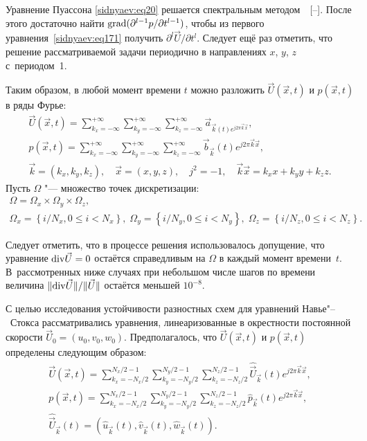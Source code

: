 Уравнение Пуассона \eqref{sidnyaev:eq20} решается спектральным методом~~[--]. 
После этого достаточно найти $\mathop{\rm grad}({\partial^{l-1}p}/{\partial t^{l-1}})$, чтобы
из первого уравнения~\eqref{sidnyaev:eq171} получить ${\partial ^l\vec {U}}/
{\partial t^l}$. 
Следует ещё раз отметить, что решение рассматриваемой задачи периодично в направлениях $x$, $y$, $z$ с~периодом~1.

Таким образом, в любой момент времени $t$ можно разложить $\vec {U}(\vec {x},t )$ и $p (\vec {x},t)$ в ряды Фурье:
\begin{gather*}
\vec {U}(\vec {x},t)=\sum\limits_{k_x =-\infty}^{+\infty}
\sum\limits_{k_y =-\infty }^{+\infty} \sum\limits_{k_z =-\infty
}^{+\infty } \vec {a}_{\vec {k} ( t )e^{j 2 \pi \vec {k} \vec {x}}},\\
p(\vec {x},t)=\sum\limits_{k_x =-\infty }^{+\infty }
\sum\limits_{k_y =-\infty }^{+\infty} \sum\limits_{k_z =-\infty
}^{+\infty } \vec {b}_{\vec {k}} ( t )e^{j2\pi \vec{k}\vec {x}}, \\
\vec {k}= ( k_x,k_y,k_z ), \quad \vec {x}=(x,y,z), \quad j^2=-1, \quad 
\vec {k}\vec {x}=k_x x+k_y y+k_z z.
\end{gather*}
Пусть $\Omega $ "--- множество точек дискретизации: 
\begin{gather*}
\Omega =\Omega_x \times
\Omega _y \times \Omega _z, \\
\Omega _x =\left\{ {i}/{N_x}, 0\le i<N_x \right\},
\;
\Omega _y =\left\{ {i}/{N_y}, 0\le i<N_y \right\},\;
\Omega _z =\left\{ {i}/{N_z}, 0\le i<N_z \right\}.
\end{gather*}

Следует отметить, что в процессе решения использовалось допущение, что
уравнение ${\rm div}\vec {U}=0$ остаётся справедливым на $\Omega$ в каждый момент времени~$t$. 
В~рассмотренных ниже случаях при небольшом числе шагов по времени величина $\| {\rm div}\vec {U} \| / \| \vec {U} \|$ остаётся меньшей $10^{-8}$.

С целью исследования устойчивости разностных схем для уравнений
Навье"--~Стокса рассматривались уравнения, линеаризованные в окрестности
постоянной скорости $\vec {U}_0 =\left( u_0 ,v_0 ,w_0  \right)$.
Предполагалось, что $\vec {U}( \vec {x},t )$ и $p( \vec
{x},t )$ определены следующим образом:
\begin{gather}
\vec {U} ( \vec {x},t )=\sum\limits_{k_x =- N_x/ 2}^{N_x / 2-1}
\sum\limits_{k_y =- N_y / 2}^{N_y / 2-1}
\sum\limits_{k_z =-N_z / 2}^{ N_z / 2-1}
\hat{\vec{U}}_{\vec {k}} ( t )e^{j 2 \pi \vec{k} \vec {x}}, \\
p(\vec {x},t)=\sum\limits_{k_x =- N_x / 2}^{N_x / 2 - 1}
\sum\limits_{k_y =- N_y / 2}^{ N_y /2-1}
\sum\limits_{k_z =- N_z / 2}^{ N_z / 2-1}
\hat{p} _{\vec {k}} ( t )e^{j 2 \pi \vec {k} \vec {x}},\\
\hat{\vec{U}}_{\vec {k}} ( t )=\left( \hat{u}_{\vec {k}} ( t ),
\hat{v} _{\vec {k}} ( t),
\hat{w} _{\vec {k}} ( t )\right).
\end{gather}

